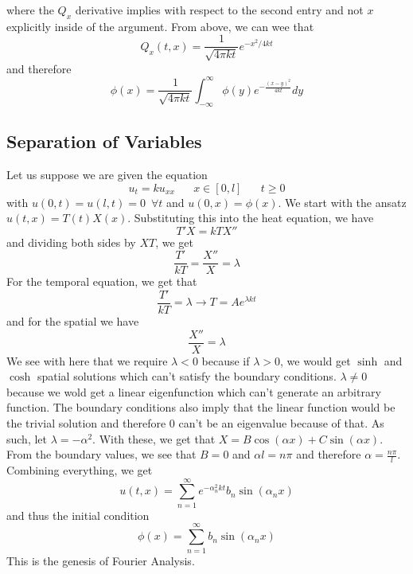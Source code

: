 \documentclass{article}
\newcommand{\twen}{\hspace{20pt}}
\newcommand{\push}{\,\,\,}
\theoremstyle{definition}
\begin{document}
where the $Q_x$ derivative implies with respect to the second entry and not $x$ explicitly inside of the argument. From above, we can wee that 
\begin{equation*}
    Q_x(t,x) = \frac{1}{\sqrt {4\pi kt}}e^{-x^2/4kt}
\end{equation*}
and therefore 
\begin{equation*}
    \phi (x)=\frac{1}{\sqrt{4\pi kt}}\int^\infty_{-\infty} \phi(y)e^{-\frac{(x-y)^2}{4kt}}dy
\end{equation*}
\subsection{Separation of Variables}
Let us suppose we are given the equation 
\begin{equation*}
    u_t=ku_{xx} \twen x\in [0,l] \twen t\geq 0
\end{equation*}
with $u(0,t)=u(l,t)=0 \push \forall t$ and $u(0,x)=\phi(x)$. We start with the ansatz $u(t,x)=T(t)X(x)$. Substituting this into the heat equation, we have 
\begin{equation*}
    T'X=kTX'' 
\end{equation*}
and dividing both sides by $XT$, we get 
\begin{equation*}
    \frac{T'}{kT} = \frac{X''}{X} = \lambda
\end{equation*}
For the temporal equation, we get that 
\begin{equation*}
    \frac{T'}{kT}=\lambda \to T=Ae^{\lambda kt}
\end{equation*}
and for the spatial we have 
\begin{equation*}
    \frac{X''}{X}=\lambda
\end{equation*}
We see with here that we require $\lambda <0$ because if $\lambda >0$, we would get $\sinh$ and $\cosh$ spatial solutions which can't satisfy the boundary conditions. $\lambda \neq 0$ because we wold get a linear eigenfunction which can't generate an arbitrary function. The boundary conditions also imply that the linear function would be the trivial solution and therefore 0 can't be an eigenvalue because of that. As such, let $\lambda = -\alpha^2$. With these, we get that $X=B\cos(\alpha x)+C\sin(\alpha x)$. From the boundary values, we see that $B=0$ and $\alpha l = n\pi$ and therefore $\alpha = \frac{n\pi}{l}$. Combining everything, we get 
\begin{equation*}
    u(t,x)=\sum^\infty_{n=1}e^{-\alpha_n^2kt}b_n\sin(\alpha_nx)
\end{equation*}
and thus the initial condition 
\begin{equation*}
    \phi(x) = \sum^\infty_{n=1}b_n\sin (\alpha_nx)
\end{equation*}
This is the genesis of Fourier Analysis.
\end{document}
